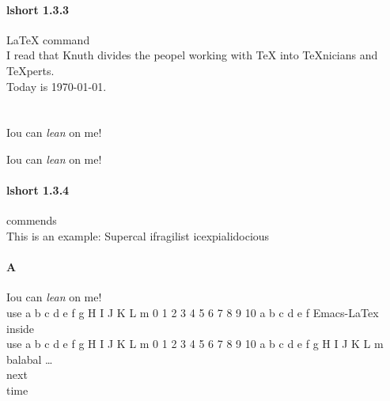 \documentclass[a4paper,11pt]{book} %
\begin{document}
\paragraph{lshort 1.3.3} \LaTeX{} command
\\  %
I read that Knuth divides the peopel working with \TeX{} into \TeX{}nicians and
\TeX perts.
\\
Today is \today.
\\  %
\\  %
\\  %
Iou can \textsl{lean} on me! 

Iou can \textsl{lean} on me! 

\paragraph{lshort 1.3.4}commends
\\This is an %
example: Supercal%
                ifragilist%
        icexpialidocious
        

\paragraph{A}
Iou can \textsl{lean} on me!  
\\%
use a b c d e f g H I J K L m 0 1 2 3 4 5 6 7 8 9 10 a b c d e f  
\linebreak[3] Emacs-LaTex inside
\\
use a b c d e f g H I J K L m 0 1 2 3 4 5 6 7 8 9 10 a b c d e f g H I J K L m 
\\
balabal \ldots{} %
\LaTeXe 
\\
next 
\\%
time

\begin{comment}
so, so
you think
you can tell
heaven from hell
\end{comment}
\end{document}
